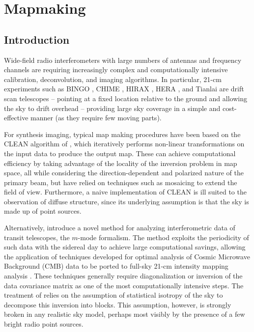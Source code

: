 \chapter{\label{chap:mapmaking} Mapmaking}


\section{Introduction} \label{ch:mm:sec:intro}

Wide-field radio interferometers with large numbers of antennas and frequency channels are requiring increasingly complex and computationally intensive calibration, deconvolution, and imaging algorithms. In particular, 21-cm experiments such as BINGO \citep{bingoupdate},  CHIME \citep{chimepath1}, HIRAX \citep{hirax}, HERA \citep{hera}, and Tianlai \citep{tianlai} are drift scan telescopes -- pointing at a fixed location relative to the ground and allowing the sky to drift overhead -- providing large sky coverage in a simple and cost-effective manner (as they require few moving parts).

For synthesis imaging, typical map making procedures have been based on the CLEAN algorithm of \cite{clean}, which iteratively performs non-linear transformations on the input data to produce the output map. These can achieve computational efficiency by taking advantage of the locality of the inversion problem in map space, all while considering the direction-dependent and polarized nature of the primary beam, but have relied on techniques such as mosaicing to extend the field of view. Furthermore, a naive implementation of CLEAN is ill suited to the observation of diffuse structure, since its underlying assumption is that the sky is made up of point sources.

Alternatively, \cite{mmodes1, mmodes2} introduce a novel method for analyzing interferometric data of transit telescopes, the $m$-mode formalism. The method exploits the periodicity of such data with the sidereal day to achieve large computational savings, allowing the application of techniques developed for optimal analysis of Cosmic Microwave Background (CMB) data \citep{bondjaffeknox, tegmark, myerscbi} to be ported to full-sky 21-cm intensity mapping analysis \citep{liutegmark}. These techniques generally require diagonalization or inversion of the data covariance matrix as one of the most computationally intensive steps. The treatment of \cite{mmodes1, mmodes2} relies on the assumption of statistical isotropy of the sky to decompose this inversion into blocks. This assumption, however, is strongly broken in any realistic sky model, perhaps most visibly by the presence of a few bright radio point sources.

